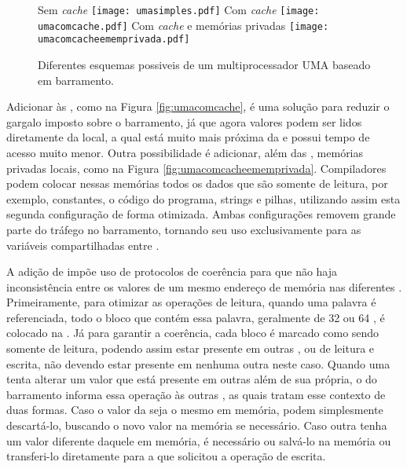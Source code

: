 \begin{figure}[tb]
  \centering
  \caption{Diferentes esquemas possiveis de um multiprocessador UMA baseado em barramento.}
    {Sem \textit{cache}}%
    {\texttt{[image: umasimples.pdf]}}%
  \hfill%
    {Com \textit{cache}}%
    {\texttt{[image: umacomcache.pdf]}}%
  \hfill%
    {Com \textit{cache} e memórias privadas}%
    {\texttt{[image: umacomcacheememprivada.pdf]}}%
  \hfill%
\end{figure}

Adicionar \caches às \CPUs, como na Figura \ref{fig:umacomcache}, é uma solução para reduzir o gargalo imposto sobre o barramento, já que agora valores podem ser lidos diretamente da \cache local, a qual está muito mais próxima da \CPU e possui tempo de acesso muito menor. Outra possibilidade é adicionar, além das \caches, memórias privadas locais,  como na Figura \ref{fig:umacomcacheememprivada}. Compiladores podem colocar nessas memórias todos os dados que são somente de leitura, por exemplo, constantes, o código do programa, strings e pilhas, utilizando assim esta segunda configuração de forma otimizada. Ambas configurações removem grande parte do tráfego no barramento, tornando seu uso exclusivamente para as variáveis compartilhadas entre \threads.

A adição de \caches impõe uso de protocolos de coerência para que não haja inconsistência entre os valores de um mesmo endereço de memória nas diferentes \caches. Primeiramente, para otimizar as operações de leitura, quando uma palavra é referenciada, todo o bloco que contém essa palavra, geralmente de 32 ou 64 \bytes, é colocado na \cache. Já para garantir a coerência, cada bloco é marcado como sendo somente de leitura, podendo assim estar presente em outras \caches, ou de leitura e escrita, não devendo estar presente em nenhuma outra \cache neste caso. Quando uma \CPU tenta alterar um valor que está presente em outras \caches além de sua própria, o \hardware do barramento informa essa operação às outras \caches, as quais tratam esse contexto de duas formas. Caso o valor da \cache seja o mesmo em memória, podem simplesmente descartá-lo, buscando o novo valor na memória se necessário. Caso outra \cache tenha um valor diferente daquele em memória, é necessário ou salvá-lo na memória ou transferi-lo diretamente para a \cache que solicitou a operação de escrita.

